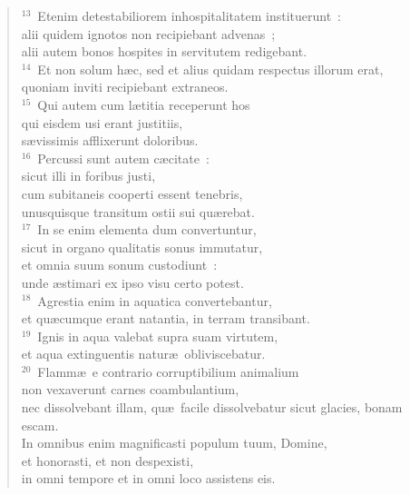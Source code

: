 \begin{flushleft}\begin{verse}${}^{13}$~Etenim detestabiliorem inhospitalitatem instituerunt~:\\ alii quidem ignotos non recipiebant advenas~;\\ alii autem bonos hospites in servitutem redigebant.\\
${}^{14}$~Et non solum h\ae c, sed et alius quidam respectus illorum erat,\\ quoniam inviti recipiebant extraneos.\\
${}^{15}$~Qui autem cum l\ae titia receperunt hos\\ qui eisdem usi erant justitiis,\\ s\ae vissimis afflixerunt doloribus.\\
${}^{16}$~Percussi sunt autem c\ae citate~:\\ sicut illi in foribus justi,\\ cum subitaneis cooperti essent tenebris,\\ unusquisque transitum ostii sui qu\ae rebat.\\
${}^{17}$~In se enim elementa dum convertuntur,\\ sicut in organo qualitatis sonus immutatur,\\ et omnia suum sonum custodiunt~:\\ unde \ae stimari ex ipso visu certo potest.\\
${}^{18}$~Agrestia enim in aquatica convertebantur,\\ et qu\ae cumque erant natantia, in terram transibant.\\
${}^{19}$~Ignis in aqua valebat supra suam virtutem,\\ et aqua extinguentis natur\ae\ obliviscebatur.\\
${}^{20}$~Flamm\ae\ e contrario corruptibilium animalium\\ non vexaverunt carnes coambulantium,\\ nec dissolvebant illam, qu\ae\ facile dissolvebatur sicut glacies, bonam escam.\\ In omnibus enim magnificasti populum tuum, Domine,\\ et honorasti, et non despexisti,\\ in omni tempore et in omni loco assistens eis.\end{verse}\end{flushleft}


